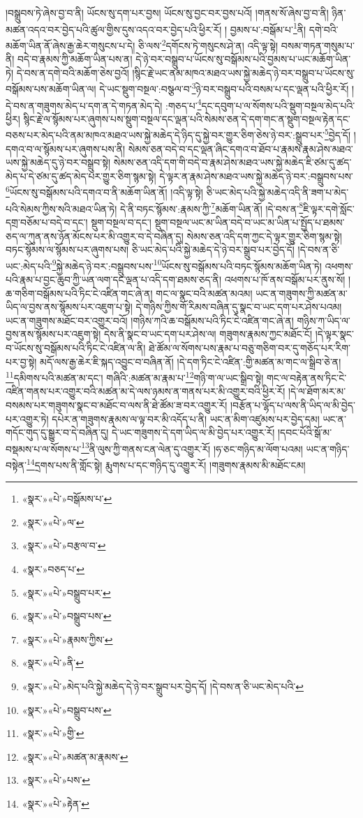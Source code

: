 །བསྒྲུབས་ཏེ་ཞེས་བྱ་བ་ནི། ཡོངས་སུ་དག་པར་བྱས། ཡོངས་སུ་བྱང་བར་བྱས་པའོ། །གནས་སོ་ཞེས་བྱ་བ་ནི། ཉིན་མཚན་འདའ་བར་བྱེད་པའི་ཚུལ་གྱིས་དུས་འདའ་བར་བྱེད་པའི་ཕྱིར་རོ། །
བྱམས་པ་:བསྒོམ་པ་\footnote{«སྣར་»«པེ་»བསྒོམས་པ་}ནི། དགེ་བའི་མཆོག་ཡིན་ནོ་ཞེས་རྒྱ་ཆེར་གསུངས་པ་དེ། ཅི་ལས་\footnote{«སྣར་»«པེ་»ལ་}དགོངས་ཏེ་གསུངས་ཤེ་ན། འདི་ལྟ་སྟེ། བསམ་གཏན་གསུམ་པ་ནི། བདེ་བ་རྣམས་ཀྱི་མཆོག་ཡིན་པས་ན། དེ་ཉེ་བར་བསྒྲུབ་པ་ཡོངས་སུ་བསྒོམས་པའི་བྱམས་པ་ཡང་མཆོག་ཡིན་ཏེ། དེ་བས་ན་དགེ་བའི་མཆོག་ཅེས་བྱའོ། །སྙིང་རྗེ་ཡང་ནམ་མཁའ་མཐའ་ཡས་སྐྱེ་མཆེད་ཉེ་བར་བསྒྲུབ་པ་ཡོངས་སུ་བསྒོམས་པས་མཆོག་ཡིན་ལ། དེ་ཡང་སྡུག་བསྔལ་:བསྩལ་བ་\footnote{«སྣར་»«པེ་»བརྩལ་བ་}ཉེ་བར་བསྒྲུབ་པའི་བསམ་པ་དང་ལྡན་པའི་ཕྱིར་རོ། །དེ་བས་ན་གཟུགས་མེད་པ་དག་ན་དེ་གཏན་མེད་དེ། :གཅད་པ་\footnote{«སྣར་»བཅད་པ་}དང་དབུག་པ་ལ་སོགས་པའི་སྡུག་བསྔལ་མེད་པའི་ཕྱིར། སྙིང་རྗེ་ལ་སྙོམས་པར་ཞུགས་པས་སྡུག་བསྔལ་དང་ལྡན་པའི་སེམས་ཅན་དེ་དག་གང་ན་སྡུག་བསྔལ་རྟེན་དང་བཅས་པར་མེད་པའི་ནམ་མཁའ་མཐའ་ཡས་སྐྱེ་མཆེད་དེ་ཉིད་དུ་སྐྱེ་བར་གྱུར་ཅིག་ཅེས་ཉེ་བར་:སྒྲུབ་པར་\footnote{«སྣར་»«པེ་»བསྒྲུབ་པར་}བྱེད་དོ། །དགའ་བ་ལ་སྙོམས་པར་ཞུགས་པས་ནི། སེམས་ཅན་བདེ་བ་དང་ལྡན་ཞིང་དགའ་བ་ཐོབ་པ་རྣམས་རྣམ་ཤེས་མཐའ་ཡས་སྐྱེ་མཆེད་དུ་ཉེ་བར་བསྒྲུབ་སྟེ། སེམས་ཅན་འདི་དག་གི་བདེ་བ་རྣམ་ཤེས་མཐའ་ཡས་སྐྱེ་མཆེད་ཇི་ཙམ་དུ་ཚད་མེད་པ་དེ་ཙམ་དུ་ཚད་མེད་པར་གྱུར་ཅིག་སྙམ་སྟེ། དེ་ལྟར་ན་རྣམ་ཤེས་མཐའ་ཡས་སྐྱེ་མཆེད་ཉེ་བར་:བསྒྲུབས་པས་\footnote{«སྣར་»«པེ་»བསྒྲུབ་པས་}ཡོངས་སུ་བསྒོམས་པའི་དགའ་བ་ནི་མཆོག་ཡིན་ནོ། །འདི་ལྟ་སྟེ། ཅི་ཡང་མེད་པའི་སྐྱེ་མཆེད་འདི་ནི་ཟག་པ་མེད་པའི་སེམས་ཀྱིས་སའི་མཐའ་ཡིན་ཏེ། དེ་ནི་བཏང་སྙོམས་:རྣམས་ཀྱི་\footnote{«སྣར་»«པེ་»རྣམས་ཀྱིས་}མཆོག་ཡིན་ནོ། །དེ་བས་ན་\footnote{«སྣར་»«པེ་»ནི་}ཇི་ལྟར་དགེ་སློང་དགྲ་བཅོམ་པ་བདེ་བ་དང་། སྡུག་བསྔལ་བ་དང་། སྡུག་བསྔལ་ཡང་མ་ཡིན་བདེ་བ་ཡང་མ་ཡིན་པ་སྤྱོད་པ་ཐམས་ཅད་ལ་ཀུན་ནས་ཉོན་མོངས་པར་མི་འགྱུར་བ་དེ་བཞིན་དུ། སེམས་ཅན་འདི་དག་ཀྱང་དེ་ལྟར་གྱུར་ཅིག་སྙམ་སྟེ། བཏང་སྙོམས་ལ་སྙོམས་པར་ཞུགས་པས། ཅི་ཡང་མེད་པའི་སྐྱེ་མཆེད་དེ་ཉེ་བར་སྒྲུབ་པར་བྱེད་དོ། །དེ་བས་ན་ཅི་ཡང་:མེད་པའི་\footnote{«སྣར་»«པེ་»མེད་པའི་སྐྱེ་མཆེད་དེ་ཉེ་བར་སྒྲུབ་པར་བྱེད་དོ། །དེ་བས་ན་ཅི་ཡང་མེད་པའི་}སྐྱེ་མཆེད་ཉེ་བར་:བསྒྲུབས་པས་\footnote{«སྣར་»«པེ་»བསྒྲུབ་པས་}ཡོངས་སུ་བསྒོམས་པའི་བཏང་སྙོམས་མཆོག་ཡིན་ཏེ། འཕགས་པའི་རྣམ་པ་བྱང་ཆུབ་ཀྱི་ཡན་ལག་དང་ལྡན་པ་འདི་དག་ཐམས་ཅད་ནི། འཕགས་པ་ཁོ་ནས་བསྒོམ་པར་ནུས་སོ། །ཆ་གཅིག་བསྒོམས་པའི་ཏིང་ངེ་འཛིན་གང་ཞེ་ན། གང་ལ་སྣང་བའི་མཚན་མའམ། ཡང་ན་གཟུགས་ཀྱི་མཚན་མ་ཡིད་ལ་བྱས་ནས་སྙོམས་པར་འཇུག་པ་སྟེ། དེ་གཉིས་ཀྱིས་གོ་རིམས་བཞིན་དུ་སྣང་བ་ཡང་དག་པར་ཤེས་པའམ། ཡང་ན་གཟུགས་མཐོང་བར་འགྱུར་བའོ། །གཉིས་ཀའི་ཆ་བསྒོམས་པའི་ཏིང་ངེ་འཛིན་གང་ཞེ་ན། གཉིས་ཀ་ཡིད་ལ་བྱས་ནས་སྙོམས་པར་འཇུག་སྟེ། དེས་ནི་སྣང་བ་ཡང་དག་པར་ཤེས་ལ། གཟུགས་རྣམས་ཀྱང་མཐོང་ངོ། །དེ་ལྟར་སྣང་བ་ཡོངས་སུ་བསྒོམས་པའི་ཏིང་ངེ་འཛིན་ལ་ནི། ཐེ་ཚོམ་ལ་སོགས་པས་རྣམ་པ་བཅུ་གཅིག་བར་དུ་གཅོད་པར་རིག་པར་བྱ་སྟེ། མདོ་ལས་རྒྱ་ཆེར་ཇི་སྐད་འབྱུང་བ་བཞིན་ནོ། །དེ་དག་ཏིང་ངེ་འཛིན་:གྱི་མཚན་མ་གང་ལ་སྒྲིབ་ཅེ་ན། \footnote{«སྣར་»«པེ་»གྱི་}དམིགས་པའི་མཚན་མ་དང་། གཞིའི་:མཚན་མ་རྣམ་པ་\footnote{«སྣར་»«པེ་»མཚན་མ་རྣམས་}གཉི་ག་ལ་ཡང་སྒྲིབ་སྟེ། གང་ལ་བརྟེན་ནས་ཏིང་ངེ་འཛིན་གནས་པར་འགྱུར་བའི་མཚན་མ་དེ་ལས་ཉམས་ན་གནས་པར་མི་འགྱུར་བའི་ཕྱིར་རོ། །དེ་ལ་ཐོག་མར་མ་བསམས་པར་གཟུགས་སྣང་བ་མཐོང་བ་ལས་ནི་ཐེ་ཚོམ་ཟ་བར་འགྱུར་རོ། །བརྩོན་པ་ལྷོད་པ་ལས་ནི་ཡིད་ལ་མི་བྱེད་པར་འགྱུར་ཏེ། དཔེར་ན་གཟུགས་རྣམས་ལ་ལྟ་བར་མི་འདོད་པ་ནི། ཡང་ན་མིག་འཛུམས་པར་བྱེད་དམ། ཡང་ན་གདོང་གུད་དུ་སྒྱུར་བ་དེ་བཞིན་དུ། དེ་ཡང་གཟུགས་དེ་དག་ཡིད་ལ་མི་བྱེད་པར་འགྱུར་རོ། །དབང་པོའི་སྒོ་མ་བསྡམས་པ་ལ་སོགས་པ་\footnote{«སྣར་»«པེ་»པས་}ནི་ལུས་ཀྱི་གནས་ངན་ལེན་དུ་འགྱུར་རོ། །ཧ་ཅང་གཉིད་མ་ལོག་པའམ། ཡང་ན་གཉིད་བསྟེན་\footnote{«སྣར་»«པེ་»རྟེན་}དྲགས་པས་ནི་གློང་སྟེ། རྨུགས་པ་དང་གཉིད་དུ་འགྱུར་རོ། །གཟུགས་རྣམས་མི་མཐོང་ངམ། 